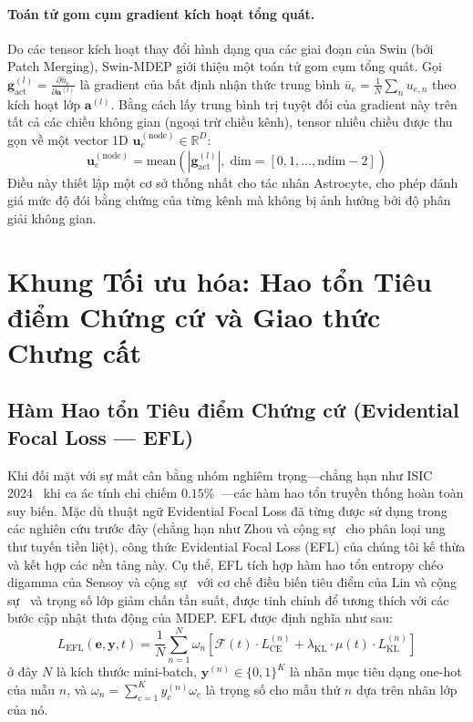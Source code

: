 \documentclass[11pt, a4paper]{article}
\newcommand{\R}{\mathbb{R}}
\begin{document}
\paragraph{Toán tử gom cụm gradient kích hoạt tổng quát.}
Do các tensor kích hoạt thay đổi hình dạng qua các giai đoạn của Swin (bởi Patch Merging), Swin-MDEP giới thiệu một toán tử gom cụm tổng quát. Gọi $\bm{g}_{\text{act}}^{(l)} = \frac{\partial \bar{u}_e}{\partial \bm{a}^{(l)}}$ là gradient của bất định nhận thức trung bình $\bar{u}_e = \frac{1}{N}\sum_n u_{e,n}$ theo kích hoạt lớp $\bm{a}^{(l)}$. Bằng cách lấy trung bình trị tuyệt đối của gradient này trên tất cả các chiều không gian (ngoại trừ chiều kênh), tensor nhiều chiều được thu gọn về một vector 1D $\bm{u}_e^{(\text{node})} \in \R^D$:
\begin{equation}\label{eq:activation_pooling}
    \bm{u}_e^{(\text{node})} = \text{mean}\!\left(|\bm{g}_{\text{act}}^{(l)}|,\; \text{dim}=[0, 1, \ldots, \text{ndim}-2]\right)
\end{equation}
Điều này thiết lập một cơ sở thống nhất cho tác nhân Astrocyte, cho phép đánh giá mức độ đói bằng chứng của từng kênh mà không bị ảnh hưởng bởi độ phân giải không gian.

\section{Khung Tối ưu hóa: Hao tổn Tiêu điểm Chứng cứ và Giao thức Chưng cất}\label{sec:optimization}

\subsection{Hàm Hao tổn Tiêu điểm Chứng cứ (Evidential Focal Loss --- EFL)}\label{subsec:efl}

Khi đối mặt với sự mất cân bằng nhóm nghiêm trọng---chẳng hạn như ISIC 2024~\cite{isic2024} khi ca ác tính chỉ chiếm $0.15\%$~\cite{johnson2019survey}---các hàm hao tổn truyền thống hoàn toàn suy biến. Mặc dù thuật ngữ Evidential Focal Loss đã từng được sử dụng trong các nghiên cứu trước đây (chẳng hạn như Zhou và cộng sự~\cite{zhou2023domain} cho phân loại ung thư tuyến tiền liệt), công thức Evidential Focal Loss (EFL) của chúng tôi kế thừa và kết hợp các nền tảng này. Cụ thể, EFL tích hợp hàm hao tổn entropy chéo digamma của Sensoy và cộng sự~\cite{sensoy2018evidential} với cơ chế điều biến tiêu điểm của Lin và cộng sự~\cite{lin2017focal} và trọng số lớp giảm chấn tần suất, được tinh chỉnh để tương thích với các bước cập nhật thưa động của MDEP. EFL được định nghĩa như sau:
\begin{equation}\label{eq:efl}
    L_{\text{EFL}}(\bm{e}, \bm{y}, t) = \frac{1}{N} \sum_{n=1}^N \omega_n \left[\mathcal{F}(t) \cdot L_{\text{CE}}^{(n)} + \lambda_{\text{KL}} \cdot \mu(t) \cdot L_{\text{KL}}^{(n)}\right]
\end{equation}
ở đây $N$ là kích thước mini-batch, $\bm{y}^{(n)} \in \{0, 1\}^K$ là nhãn mục tiêu dạng one-hot của mẫu $n$, và $\omega_n = \sum_{c=1}^K y_c^{(n)} \omega_c$ là trọng số cho mẫu thứ $n$ dựa trên nhãn lớp của nó.
\end{document}
